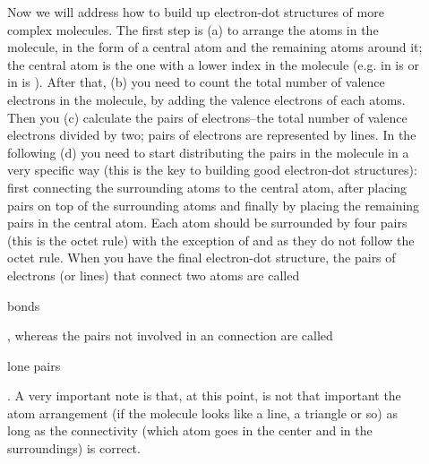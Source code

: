 \documentclass[main.tex]{subfiles}
\begin{document}
\begin{description}
\item[] Now we will address how to build up electron-dot structures of more complex molecules. The first step is (a) to arrange the atoms in the molecule, in the form of a central atom and the remaining atoms around it; the central atom is the one with a lower index in the molecule (e.g. in  is  or in  is ). After that, (b) you need to count the total number of valence electrons in the molecule, by adding the valence electrons of each atoms. Then you (c) calculate the pairs of electrons--the total number of valence electrons divided by two; pairs of electrons are represented by lines. In the following (d) you need to start distributing the pairs in the molecule in a very specific way (this is the key to building good electron-dot structures): first connecting the surrounding atoms to the central atom, after placing pairs on top of the surrounding atoms and finally by placing the remaining pairs in the central atom. Each atom should be surrounded by four pairs (this is the octet rule) with the exception of  and  as they do not follow the octet rule. When you have the final electron-dot structure, the pairs of electrons (or lines) that connect two atoms are called \begin{it}bonds\end{it}, whereas the pairs not involved in an connection are called \begin{it}lone pairs\end{it}. A very important note is that, at this point, is not that important the atom arrangement (if the molecule looks like a line, a triangle or so) as long as the connectivity (which atom goes in the center and in the surroundings) is correct. 


\end{description}
\end{document}
